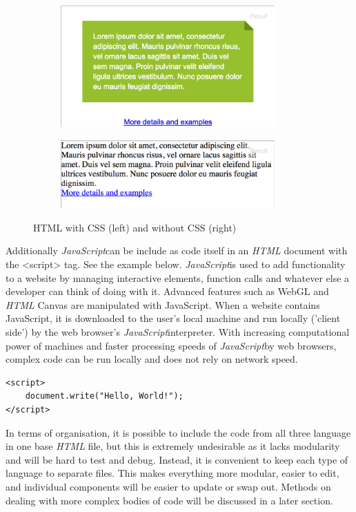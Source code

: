 \documentclass[a4paper,11pt,twoside]{article}
\begin{document}
\begin{figure}
\centering
\begin{subfigure}{.5\textwidth}
  \centering
  \includegraphics[width=82mm]{graphics/css_01.png}

  \label{fig:sub1}
\end{subfigure}%
\begin{subfigure}{.5\textwidth}
  \centering
  \includegraphics[width=82mm]{graphics/css_02.png}

  \label{fig:sub2}
\end{subfigure}
\caption{HTML with CSS (left) and without CSS (right)}

\end{figure}


Additionally \textit{JavaScript}can be include as code itself in an \textit{HTML} document with the <script> tag. See the example below. \textit{JavaScript}is used to add functionality to a website by managing interactive elements, function calls and whatever else a developer can think of doing with it. Advanced features such as WebGL and \textit{HTML} Canvas are manipulated with JavaScript. When a website contains JavaScript, it is downloaded to the user's local machine and run locally ('client side') by the web browser's \textit{JavaScript}interpreter. With increasing computational power of machines and faster processing speeds of \textit{JavaScript}by web browsers, complex code can be run locally and does not rely on network speed.



\begin{verbatim}
<script>
    document.write("Hello, World!");
</script>
\end{verbatim}


In terms of organisation, it is possible to include the code from all three language in one base \textit{HTML} file, but this is extremely undesirable as it lacks modularity and will be hard to test and debug. Instead, it is convenient to keep each type of language to separate files. This makes everything more modular, easier to edit, and individual components will be easier to update or swap out. Methods on dealing with more complex bodies of code will be discussed in a later section.
\end{document}
